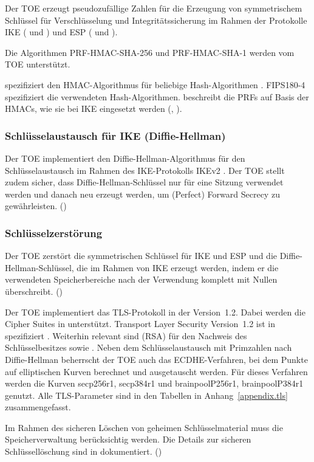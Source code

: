 Der TOE erzeugt pseudozufällige Zahlen für die Erzeugung von symmetrischem
Schlüssel für Verschlüsselung und Integritätssicherung im Rahmen der Protokolle
IKE ( und ) und ESP ( und
).

Die Algorithmen PRF-HMAC-SHA-256 und PRF-HMAC-SHA-1 werden vom TOE unterstützt.

 spezifiziert den HMAC-Algorithmus für beliebige Hash-Algorithmen
\cite{rfc2104}.  FIPS180-4 \cite{FIPS180-4} spezifiziert die verwendeten
Hash-Algorithmen. \cite{rfc4868} beschreibt die PRFs auf Basis der HMACs, wie
sie bei IKE eingesetzt werden (, ).


\subsubsection{Schlüsselaustausch für IKE (Diffie-Hellman)}%
\label{sf.cryptographicservices.ipsec.keyexc}

Der TOE implementiert den Diffie-Hellman-Algorithmus für den Schlüsselaustausch
im Rahmen des IKE-Protokolls IKEv2 \cite{rfc7296}.  Der TOE stellt zudem sicher,
dass Diffie-Hellman-Schlüssel nur für eine Sitzung verwendet werden und danach
neu erzeugt werden, um (Perfect) Forward Secrecy zu
gewährleisten. ()

\subsubsection{Schlüsselzerstörung}%
\label{sf.cryptographicservices.ipsec.keydest}

Der TOE zerstört die symmetrischen Schlüssel für IKE und ESP und die
Diffie-Hellman-Schlüssel, die im Rahmen von IKE erzeugt werden, indem er die
verwendeten Speicherbereiche nach der Verwendung komplett mit Nullen
überschreibt. ()


Der TOE implementiert das TLS-Protokoll in der Version~1.2. Dabei werden die
Cipher Suites in  unterstützt.  Transport Layer
Security Version~1.2 ist in  spezifiziert \cite{rfc5246}. Weiterhin
relevant sind  (RSA) für den Nachweis des Schlüsselbesitzes
\cite{rfc8017} sowie . Neben dem Schlüsselaustausch mit Primzahlen
nach Diffie-Hellman beherrscht der TOE auch das ECDHE-Verfahren, bei dem Punkte
auf elliptischen Kurven berechnet und ausgetauscht werden. Für dieses Verfahren
werden die Kurven secp256r1, secp384r1 \cite{rfc8422, X9.62} und
brainpoolP256r1, brainpoolP384r1 \cite{rfc7027} genutzt. Alle TLS-Parameter sind
in den Tabellen in Anhang~\ref{appendix.tls} zusammengefasst.

Im Rahmen des sicheren Löschen von geheimen Schlüsselmaterial muss die
Speicherverwaltung berücksichtig werden. Die Details zur sicheren
Schlüssellöschung sind in \autocite{adv_tds} dokumentiert.
()



